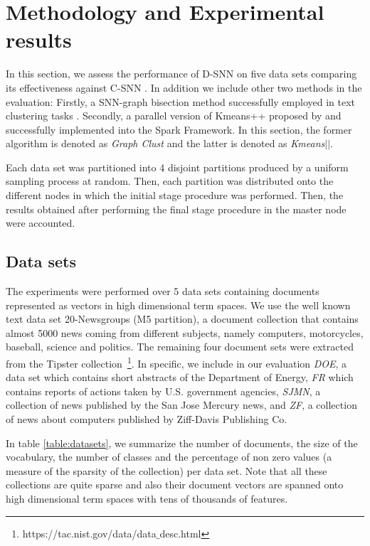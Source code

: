 \documentclass[preprint,12pt,authoryear,review]{elsarticle}
\begin{document}
\section{Methodology and Experimental results}
\label{sec:exps}

In this section, we assess the performance of D-SNN on five data sets comparing its effectiveness against C-SNN \cite{ESK03}. 
In addition we include other two methods in the evaluation: Firstly, a SNN-graph bisection method successfully employed in text clustering tasks \cite{ZK02}. Secondly, a parallel version of Kmeans++ proposed by \cite{BMVKV12} and successfully implemented into the Spark Framework. In this section, the former algorithm is denoted as \textit{Graph Clust} and the latter is denoted as \textit{Kmeans$||$}.

Each data set was partitioned into 4 disjoint partitions produced by a uniform sampling process at random. 
Then, each partition was distributed onto the different nodes in which the initial stage procedure was performed. 
Then, the results obtained after performing the final stage procedure in the master node were accounted.

\subsection*{Data sets}

The experiments were performed over 5 data sets containing documents represented as vectors in high dimensional term spaces. 
We use the well known text data set 20-Newsgroups (M5 partition), a document collection that contains almost 5000 news coming from different subjects, namely computers, motorcycles, baseball, science and politics. The remaining four document sets were extracted from the Tipster collection~\footnote{https://tac.nist.gov/data/data$\_$desc.html}. In specific, we include in our evaluation \textit{DOE}, a data set which contains short abstracts of the Department of Energy, \textit{FR} which contains reports of actions taken by U.S. government agencies, \textit{SJMN}, a collection of news published by the San Jose Mercury news, and \textit{ZF}, a collection of news about computers published by Ziff-Davis Publishing Co.

In table \ref{table:datasets}, we summarize the number of documents, the size of the vocabulary, the number of classes and the percentage of non zero values (a measure of the sparsity of the collection) per data set. Note that all these collections are quite sparse and also their document vectors are spanned onto high dimensional term spaces with tens of thousands of features. 
\end{document}
